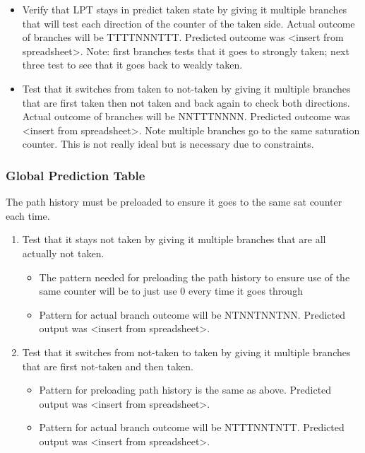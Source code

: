 \documentclass[]{report}   %
\begin{document}
\begin{itemize}
  \item{Verify that LPT stays in predict taken state by giving it multiple branches that will test each direction of the counter of the taken side. Actual outcome of branches will be TTTTNNNTTT. Predicted outcome was <insert from spreadsheet>. Note: first branches tests that it goes to strongly taken; next three test to see that it goes back to weakly taken.}

  \item{Test that it switches from taken to not-taken by giving it multiple branches that
    are first taken then not taken and back again to check both directions. Actual outcome of branches will be NNTTTNNNN. Predicted outcome was <insert from spreadsheet>. Note multiple branches go to the same saturation counter. This is not really ideal but is necessary due to constraints.}
\end{itemize}

\subsubsection{Global Prediction Table}
The path history must be preloaded to ensure it goes to the same sat counter each time.

\begin{enumerate}
  \item{Test that it stays not taken by giving it multiple branches that are all actually not taken.}

    \begin{itemize}
      \item{The pattern needed for preloading the path history to ensure use of the same counter will be to just use 0 every time it goes through}
      \item{Pattern for actual branch outcome will be NTNNTNNTNN. Predicted output was <insert from spreadsheet>.}
    \end{itemize}
  \item{Test that it switches from not-taken to taken by giving it multiple branches that are first not-taken and then taken.}
    \begin{itemize}
      \item{Pattern for preloading path history is the same as above. Predicted output was <insert from spreadsheet>.}
      \item{Pattern for actual branch outcome will be NTTTNNTNTT. Predicted output was <insert from spreadsheet>.}
    \end{itemize}
\end{enumerate}
\end{document}
